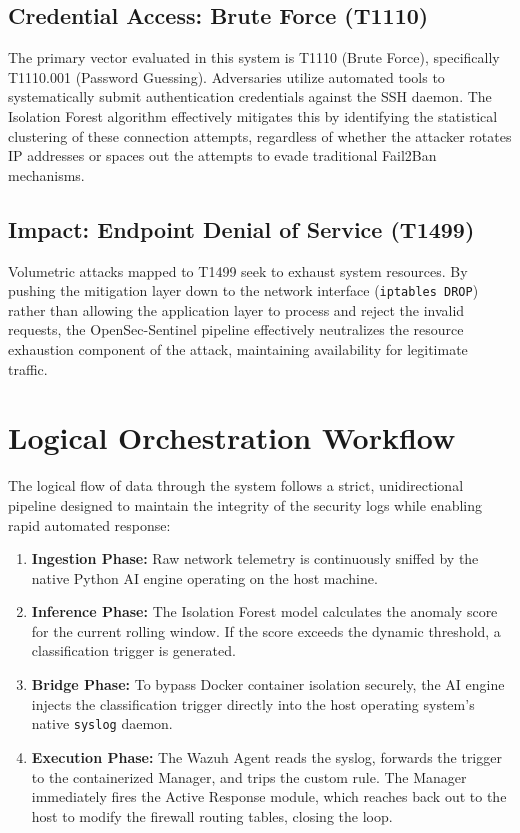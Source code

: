 \documentclass[12pt, a4paper]{report}
\begin{document}
	\subsection{Credential Access: Brute Force (T1110)}
	The primary vector evaluated in this system is T1110 (Brute Force), specifically T1110.001 (Password Guessing). Adversaries utilize automated tools to systematically submit authentication credentials against the SSH daemon. The Isolation Forest algorithm effectively mitigates this by identifying the statistical clustering of these connection attempts, regardless of whether the attacker rotates IP addresses or spaces out the attempts to evade traditional Fail2Ban mechanisms.
	
	\subsection{Impact: Endpoint Denial of Service (T1499)}
	Volumetric attacks mapped to T1499 seek to exhaust system resources. By pushing the mitigation layer down to the network interface (\texttt{iptables DROP}) rather than allowing the application layer to process and reject the invalid requests, the OpenSec-Sentinel pipeline effectively neutralizes the resource exhaustion component of the attack, maintaining availability for legitimate traffic.
	
	\section{Logical Orchestration Workflow}
	The logical flow of data through the system follows a strict, unidirectional pipeline designed to maintain the integrity of the security logs while enabling rapid automated response:
	
	
	
	\begin{enumerate}
		\item \textbf{Ingestion Phase:} Raw network telemetry is continuously sniffed by the native Python AI engine operating on the host machine.
		\item \textbf{Inference Phase:} The Isolation Forest model calculates the anomaly score for the current rolling window. If the score exceeds the dynamic threshold, a classification trigger is generated.
		\item \textbf{Bridge Phase:} To bypass Docker container isolation securely, the AI engine injects the classification trigger directly into the host operating system's native \texttt{syslog} daemon.
		\item \textbf{Execution Phase:} The Wazuh Agent reads the syslog, forwards the trigger to the containerized Manager, and trips the custom rule. The Manager immediately fires the Active Response module, which reaches back out to the host to modify the firewall routing tables, closing the loop.
	\end{enumerate}
	
\end{document}
